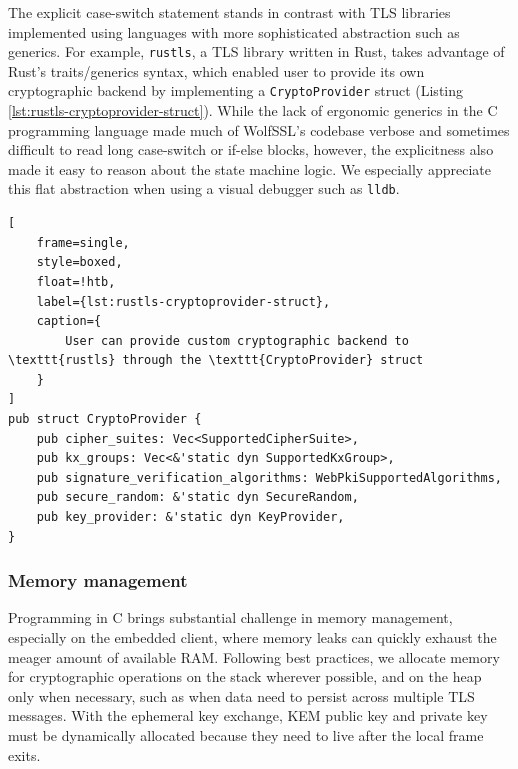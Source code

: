 \documentclass[letterpaper,12pt,titlepage,oneside,final]{book}
\begin{document}
The explicit case-switch statement stands in contrast with TLS libraries implemented using languages with more sophisticated abstraction such as generics. 
For example, \texttt{rustls}, a TLS library written in Rust, takes advantage of Rust's traits/generics syntax, which enabled user to provide its own cryptographic backend by implementing a \texttt{CryptoProvider} struct (Listing \ref{lst:rustls-cryptoprovider-struct}). 
While the lack of ergonomic generics in the C programming language made much of WolfSSL's codebase verbose and sometimes difficult to read long case-switch or if-else blocks, however, the explicitness also made it easy to reason about the state machine logic.
We especially appreciate this flat abstraction when using a visual debugger such as \texttt{lldb}.

\begin{lstlisting}[
    frame=single, 
    style=boxed,
    float=!htb,
    label={lst:rustls-cryptoprovider-struct}, 
    caption={
        User can provide custom cryptographic backend to \texttt{rustls} through the \texttt{CryptoProvider} struct
    }
]
pub struct CryptoProvider {
    pub cipher_suites: Vec<SupportedCipherSuite>,
    pub kx_groups: Vec<&'static dyn SupportedKxGroup>,
    pub signature_verification_algorithms: WebPkiSupportedAlgorithms,
    pub secure_random: &'static dyn SecureRandom,
    pub key_provider: &'static dyn KeyProvider,
}
\end{lstlisting}

\subsubsection{Memory management} Programming in C brings substantial challenge in memory management, especially on the embedded client, where memory leaks can quickly exhaust the meager amount of available RAM.
Following best practices, we allocate memory for cryptographic operations on the stack wherever possible, and on the heap only when necessary, such as when data need to persist across multiple TLS messages.
With the ephemeral key exchange, KEM public key and private key must be dynamically allocated because they need to live after the local frame exits.
\end{document}
